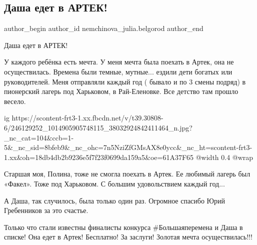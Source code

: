  
 
 
 
 
 
\subsection{Даша едет в АРТЕК!}
\label{sec:19_10_2021.fb.nemchinova_julia.belgorod.1.dasha_edet_v_artek}
 
\ifcmt
 author_begin
   author_id nemchinova_julia.belgorod
 author_end
\fi

Даша едет в АРТЕК!

У каждого ребёнка есть мечта. У меня мечта была поехать в Артек, она не
осуществилась. Времена были темные, мутные... ездили дети богатых или
руководителей. Меня отправляли каждый год ( бывало и по 3 смены подряд) в
пионерский лагерь под Харьковом, в Рай-Еленовке. Все детство там прошло весело. 

\ifcmt
  ig https://scontent-frt3-1.xx.fbcdn.net/v/t39.30808-6/246129252_1014905905748115_38032924842411464_n.jpg?_nc_cat=104&ccb=1-5&_nc_sid=8bfeb9&_nc_ohc=7n5NziZfGMsAX8e0ycc&_nc_ht=scontent-frt3-1.xx&oh=18db4db2b9236e5f7f23f0699da159a5&oe=61A37F65
  @width 0.4
  @wrap 
\fi

Старшая моя,  Полина, тоже не смогла поехать в Артек. Ее любимый лагерь был
«Факел». Тоже под Харьковом. С большим удовольствием каждый год...

А Даша, так случилось, была только один раз. Огромное спасибо Юрий Гребенников
за это счастье. 

Только что стали известны финалисты конкурса \#Большаяперемена и Даша в списке!
Она едет в Артек! Бесплатно! За заслуги! Золотая мечта осуществилась!!!

